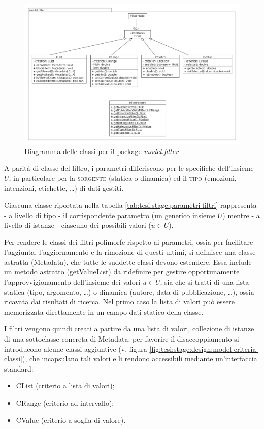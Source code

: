 \begin{figure}[ht]
	\begin{center}
		\includegraphics[width=12cm]{img/model_filter.png}
		\caption{Diagramma delle classi per il package \textit{model.filter}}
		\label{fig:tesi:stage:design:model-filter-classi}
	\end{center}
\end{figure}

  A parità di classe del filtro, i parametri differiscono per le specifiche dell'insieme $U$, in particolare per la \textsc{sorgente} (statica o dinamica) ed il \textsc{tipo} (emozioni, intenzioni, etichette, \ldots) di dati gestiti.
  
  Ciascuna classe riportata nella tabella \ref{tab:tesi:stage:parametri-filtri} rappresenta - a livello di tipo - il corrispondente parametro (un generico insieme $U$) mentre - a livello di istanze - ciascuno dei possibili valori ($u \in U$).

Per rendere le classi dei filtri polimorfe rispetto ai parametri, ossia per facilitare l'aggiunta, l'aggiornamento e la rimozione di questi ultimi, si definisce una classe astratta (\textsf{Metadata}), che tutte le suddette classi devono estendere. Essa include un metodo astratto (\textsf{getValueList}) da ridefinire per gestire opportunamente l'approvvigionamento dell'insieme dei valori $u \in U$, sia che si tratti di una lista statica (tipo, argomento, \ldots) o dinamica (autore, data di pubblicazione, \ldots), ossia ricavata dai risultati di ricerca. Nel primo caso la lista di valori può essere memorizzata direttamente in un campo dati statico della classe.

I filtri vengono quindi creati a partire da una lista di valori, collezione di istanze di una sottoclasse concreta di \textsf{Metadata}: per favorire il disaccoppiamento si introducono alcune classi aggiuntive (v. figura \ref{fig:tesi:stage:design:model-criteria-classi}), che incapsulano tali valori e li rendono accessibili mediante un'interfaccia standard:
\begin{itemize}
  \item \textsf{CList} (criterio a lista di valori);
  \item \textsf{CRange} (criterio ad intervallo);
  \item \textsf{CValue} (criterio a soglia di valore).
\end{itemize}

